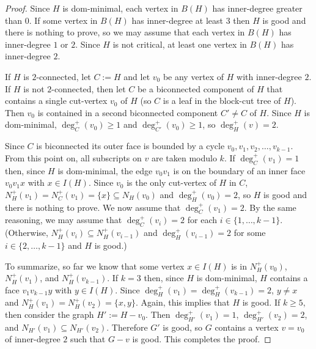 \documentclass[12pt]{article}
\begin{document}
\begin{proof}
  Since $H$ is dom-minimal, each vertex in $B(H)$ has inner-degree greater than $0$.  If some vertex in $B(H)$ has inner-degree at least $3$ then $H$ is good and there is nothing to prove, so we may assume that each vertex in $B(H)$ has inner-degree $1$ or $2$.  Since $H$ is not critical, at least one vertex in $B(H)$ has inner-degree $2$.

  If $H$ is $2$-connected, let $C:=H$ and let $v_0$ be any vertex of $H$ with inner-degree $2$.
  If $H$ is not $2$-connected, then let $C$ be a biconnected component of $H$ that contains a single cut-vertex $v_0$ of $H$ (so $C$ is a leaf in the block-cut tree of $H$). Then $v_0$ is contained in a second biconnected component $C'\neq C$ of $H$. Since $H$ is dom-minimal, $\deg^+_{C}(v_0)\ge 1$ and $\deg^+_{C'}(v_0)\ge 1$, so $\deg^+_H(v)= 2$.

  Since $C$ is biconnected its outer face is bounded by a cycle $v_0,v_1,v_2,\ldots,v_{k-1}$.  From this point on, all subscripts on $v$ are taken modulo $k$.  If $\deg^+_C(v_1)=1$ then, since $H$ is dom-minimal, the edge $v_0v_1$ is on the boundary of an inner face $v_0v_1x$ with $x\in I(H)$.  Since $v_0$ is the only cut-vertex of $H$ in $C$, $N^+_H(v_1)=N^+_C(v_1)=\{x\}\subseteq N_H(v_0)$ and $\deg^+_H(v_0)=2$, so $H$ is good and there is nothing to prove.  We now assume that $\deg^+_C(v_1)=2$.  By the same reasoning, we may assume that $\deg^+_C(v_i)=2$ for each $i\in\{1,\ldots,k-1\}$.  (Otherwise, $N^+_H(v_i)\subseteq N^+_H(v_{i-1})$ and $\deg^+_H(v_{i-1})=2$ for some $i\in\{2,\ldots,k-1\}$ and $H$ is good.)

  To summarize, so far we know that some vertex $x\in I(H)$ is in $N^+_H(v_0)$, $N^+_H(v_1)$, and $N^+_H(v_{k-1})$.  If $k=3$ then, since $H$ is dom-minimal, $H$ contains a face $v_1v_{k-1}y$ with $y\in I(H)$.  Since $\deg^+_H(v_1)=\deg^+_H(v_{k-1})=2$, $y\neq x$ and $N^+_H(v_1)=N^+_H(v_2)=\{x,y\}$. Again, this implies that $H$ is good.  If $k\ge 5$, then consider the graph $H':=H-v_0$.  Then $\deg^+_{H'}(v_1)=1$, $\deg^+_{H'}(v_2)=2$, and $N_{H'}(v_1)\subseteq N_{H'}(v_2)$.   Therefore $G'$ is good, so $G$ contains a vertex $v=v_0$ of inner-degree $2$ such that $G-v$ is good.  This completes the proof.
\end{proof}
\end{document}
